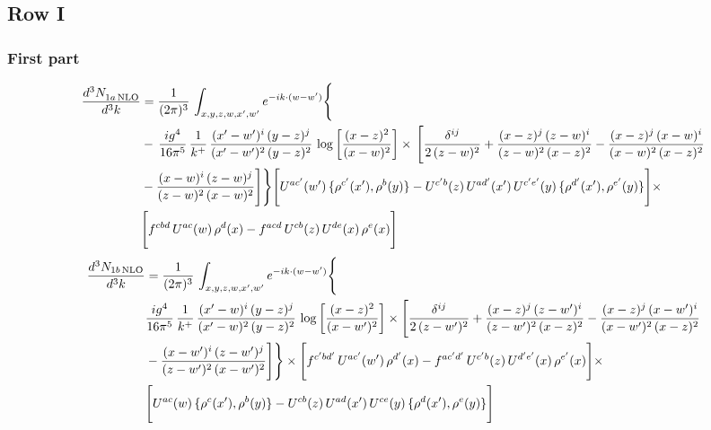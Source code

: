\documentclass[9pt]{article}
\numberwithin{equation}{section}
\begin{document}
\subsection{Row I}
\subsubsection{First part}
\begin{align}
 \frac{d^{3}N_{1a\,\rm NLO}^{\rm}}{d^{3}k}  & =     \frac{1}{(2\pi)^{3}}\,\int_{x,y,z,w,x',w^{\prime}} e^{-ik\cdot (w-w')}\Bigg\{\notag \\
& -\, \frac{ig^{4}}{16\pi^{5}}\,\frac{1}{k^{+}}\, \frac{(x'-w')^{i}\,(y-z)^{j}}{(x'-w')^{2}\,(y-z)^{2}}\,\log{\left[\frac{(x-z)^{2}}{(x-w)^{2}}\right]}\times\,\Bigg[\frac{\delta^{ij}}{2\,(z-w)^{2}}+\frac{(x-z)^{j}\,(z-w)^{i}}{(z-w)^{2}\,(x-z)^{2}}-\frac{(x-z)^{j}\,(x-w)^{i}}{(x-w)^{2}\,(x-z)^{2}}\notag \\ & -\frac{(x-w)^{i}\,(z-w)^{j}}{(z-w)^{2}\,(x-w)^{2}}\Bigg]\Bigg\} \Bigg[U^{ac'}(w')\,\{\rho^{c'}(x'),\rho^{b}(y)\}-U^{c'b}(z)\,U^{ad'}(x')\,U^{c'e'}(y)\, \{\rho^{d'}(x'),\rho^{e'}(y)\}\Bigg]\times\notag \\ &  \Bigg[f^{cbd}\,U^{ac}(w)\,\rho^{d}(x)-f^{acd}\, U^{cb}(z)\,U^{de}(x)\,\rho^{e}(x)\Bigg]
\end{align}
\begin{align}
\frac{d^{3}N_{1b\, \rm NLO}}{d^{3}k} & =  \frac{1}{(2\pi)^{3}}\,\int_{x,y,z,w,x',w^{\prime}} e^{-ik\cdot (w-w')}\Bigg\{\notag \\
&  \frac{ig^{4}}{16\pi^{5}}\,\frac{1}{k^{+}}\, \frac{(x'-w)^{i}\,(y-z)^{j}}{(x'-w)^{2}\,(y-z)^{2}}\,\log{\left[\frac{(x-z)^{2}}{(x-w')^{2}}\right]}\times \Bigg[\frac{\delta^{ij}}{2\,(z-w')^{2}}+\frac{(x-z)^{j}\,(z-w')^{i}}{(z-w')^{2}\,(x-z)^{2}}-\frac{(x-z)^{j}\,(x-w')^{i}}{(x-w')^{2}\,(x-z)^{2}}\notag \\ & -\frac{(x-w')^{i}\,(z-w')^{j}}{(z-w')^{2}\,(x-w')^{2}}\Bigg]\Bigg\}  \times\Bigg[f^{c'bd'}\,U^{ac'}(w')\,\rho^{d'}(x)-f^{ac'd'}\, U^{c'b}(z)\,U^{d'e'}(x)\,\rho^{e'}(x)\Bigg] \times\notag \\ &  \Bigg[U^{ac}(w)\,\{\rho^{c}(x'),\rho^{b}(y)\}-U^{cb}(z)\,U^{ad}(x')\,U^{ce}(y)\, \{\rho^{d}(x'),\rho^{e}(y)\}\Bigg]
\end{align}
\end{document}
